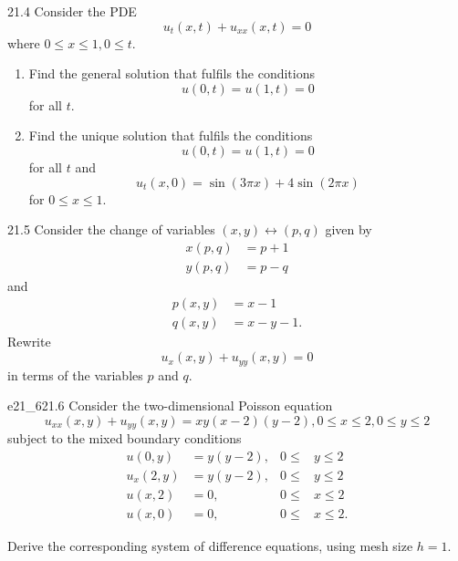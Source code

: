 \begin{problem}{21.4}
  Consider the PDE
  \begin{equation*}
    u_{t}(x,t) + u_{x x}(x,t) = 0
  \end{equation*}
  where $0\leq x \leq 1, 0 \leq t$.

  \begin{enumerate}[label=\alph*)]
    \item Find the general solution that fulfils the conditions
      \begin{equation*}
        u(0,t) = u(1,t) = 0
      \end{equation*}
      for all $t$.
    \item Find the unique solution that fulfils the conditions
      \begin{equation*}
        u(0,t) = u(1,t) = 0
      \end{equation*}
      for all $t$ and
      \begin{equation*}
        u_t(x,0) = \sin(3\pi x) + 4 \sin (2\pi x)
      \end{equation*}
      for $0 \leq x \leq 1$.
  \end{enumerate}
\end{problem}

\begin{problem}{21.5}
  Consider the change of variables $(x,y) \leftrightarrow (p,q)$ given by
  \begin{align*}
    x(p,q) &= p + 1 \\
    y(p,q) &= p - q 
  \end{align*}
  and
  \begin{align*}
    p(x,y) &= x-1 \\
    q(x,y) &= x - y - 1
  .\end{align*}
  Rewrite
  \begin{equation*}
    u_x(x,y) + u_{yy}(x,y) = 0
  \end{equation*}
  in terms of the variables $p$ and $q$.
\end{problem}

\begin{problemwithimage}{e21_6}{21.6}
  Consider the two-dimensional Poisson equation
  \begin{equation*}
    u_{x x}(x,y) + u_{yy}(x,y) = xy(x-2) (y-2), 0 \leq x \leq 2, 0\leq y \leq 2
  \end{equation*}
  subject to the mixed boundary conditions
  \begin{align*}
    u(0,y) &= y(y-2), & 0 \leq  &y\leq 2 \\
    u_x(2,y) &= y(y-2), & 0\leq &y \leq 2 \\
    u(x,2) &= 0, & 0 \leq &x \leq 2 \\
    u(x,0) &= 0, & 0 \leq &x \leq 2
  .\end{align*}

  Derive the corresponding system of difference equations, using mesh size $h = 1$.
\end{problemwithimage}


